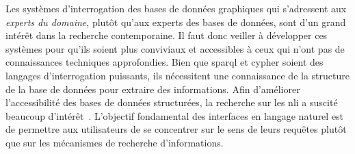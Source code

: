 Les systèmes d'interrogation des bases de données graphiques qui s'adressent aux \textit{experts du domaine}, plutôt qu'aux experts des bases de données, sont d'un grand intérêt dans la recherche contemporaine.
Il faut donc veiller à développer ces systèmes pour qu'ils soient plus conviviaux et accessibles à ceux qui n'ont pas de connaissances techniques approfondies.
Bien que \gls{sparql} et \gls{cypher} soient des langages d'interrogation puissants, ils nécessitent une connaissance de la structure de la base de données pour extraire des informations.
Afin d'améliorer l'accessibilité des bases de données structurées, la recherche sur les \gls{nli} a suscité beaucoup d'intérêt~\cite{wangCrossdomainNaturalLanguage2019,zhengQuestionAnsweringKnowledge2018}.
L'objectif fondamental des interfaces en langage naturel est de permettre aux utilisateurs de se concentrer sur le sens de leurs requêtes plutôt que sur les mécanismes de recherche d'informations.

